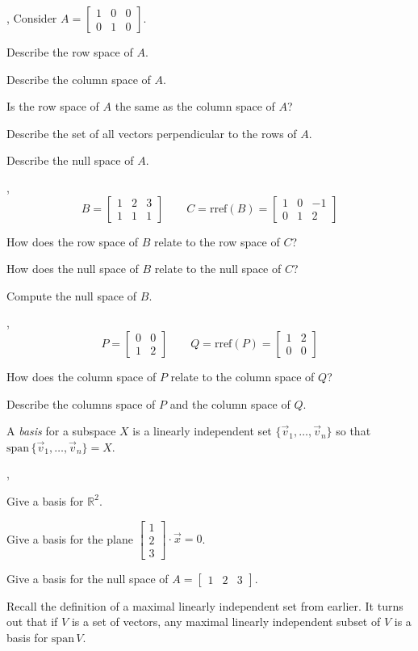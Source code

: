 \documentclass{article}
\newcommand{\R}{\mathbb{R}}
\renewcommand{\span}{\mathrm{span}\,}
\newcommand{\rref}{\mathrm{rref}}
\newcommand{\mat}[1]{\begin{bmatrix}#1\end{bmatrix}}
\newcommand{\sepl}{\sep \vspace{-.35in}}
\begin{document}
\sep
Consider $A=\mat{1&0&0\\0&1&0}$.
\begin{Enum}
	\item Describe the row space of $A$.
	\item Describe the column space of $A$.
	\item Is the row space of $A$ the same as the column space of $A$?
	\item Describe the set of all vectors perpendicular to the rows of $A$.
	\item Describe the null space of $A$.
\end{Enum}

\sep
\[
	B=\mat{1&2&3\\1&1&1}\qquad C=\rref(B)=\mat{1&0&-1\\0&1&2}
\]
\begin{Enum}
	\item How does the row space of $B$ relate to the row space of $C$?
	\item How does the null space of $B$ relate to the null space of $C$?
	\item Compute the null space of $B$.
\end{Enum}

\sep
\[
	P=\mat{0&0\\1&2}\qquad Q=\rref(P)=\mat{1&2\\0&0}
\]
\begin{Enum}
	\item How does the column space of $P$ relate to the column space of $Q$?
	\item Describe the columns space of $P$ and the column space of $Q$.
\end{Enum}

\begin{Def}
A \emph{basis} for a subspace $X$ is a linearly independent set $\{\vec v_1,\ldots,\vec v_n\}$
so that $\span\{\vec v_1,\ldots,\vec v_n\}=X$.
\end{Def}

\sepl
\begin{Enum}
	\item Give a basis for $\R^2$.
	\item Give a basis for the plane $\mat{1\\2\\3}\cdot \vec x=0$.
	\item Give a basis for the null space of $A=\mat{1&2&3}$.
\end{Enum}

Recall the definition of a maximal linearly independent set from earlier. It turns out
that if $V$ is a set of vectors, any maximal linearly independent subset of $V$ is a basis
for $\span V$.
\end{document}
